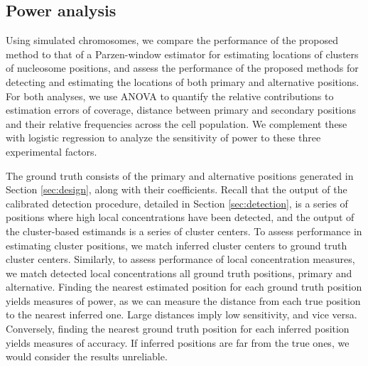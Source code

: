 \subsection{Power analysis}
\label{sec:power}

Using simulated chromosomes, we compare the performance of the proposed method to that of a Parzen-window estimator for estimating locations of clusters of nucleosome positions, and assess the performance of the proposed methods for detecting and estimating the locations of both primary and alternative positions.
For both analyses, we use ANOVA to quantify the relative contributions to estimation errors of coverage, distance between primary and secondary positions and their relative frequencies across the cell population.
We complement these with logistic regression to analyze the sensitivity of power to these three experimental factors.

The ground truth consists of the primary and alternative positions generated in Section \ref{sec:design}, along with their coefficients.
Recall that the output of the calibrated detection procedure, detailed in Section \ref{sec:detection}, is a series of positions where high local concentrations have been detected, and the output of  the cluster-based estimands is a series of cluster centers.
%
%
To assess performance in estimating cluster positions, we match inferred cluster centers to ground truth cluster centers.
Similarly, to assess performance of local concentration measures, we match detected local concentrations all ground truth positions, primary and alternative.
%
Finding the nearest estimated position for each ground truth position yields measures of power, as we can measure the distance from each true position to the nearest inferred one.
Large distances imply low sensitivity, and vice versa.
Conversely, finding the nearest ground truth position for each inferred position yields measures of accuracy.
If inferred positions are far from the true ones, we would consider the results unreliable.

